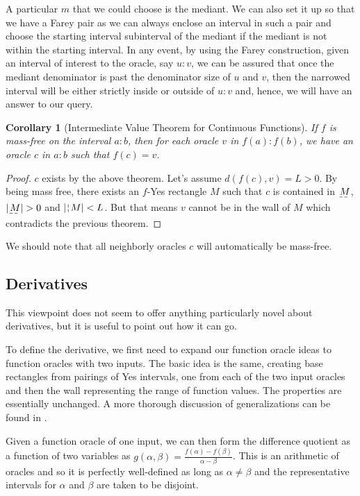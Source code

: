\documentclass[12pt]{article}
\newtheorem{corollary}{Corollary}[section]
\begin{document}
A particular $m$ that we could choose is the mediant. We can also set it up so that we have a Farey pair as we can always enclose an interval in such a pair and choose the starting interval subinterval of the mediant if the mediant is not within the starting interval. In any event, by using the Farey construction, given an interval of interest to the oracle, say $u:v$, we can be assured that once the mediant denominator is past the denominator size of $u$ and $v$, then the narrowed interval will be either strictly inside or outside of $u:v$ and, hence, we will have an answer to our query. 

\begin{corollary}[Intermediate Value Theorem for Continuous Functions]
If $f$ is mass-free on the interval $a:b$, then for each oracle $v$ in $f(a):f(b)$, we have an oracle $c$ in $a:b$ such that $f(c)=v$.
\end{corollary}

\begin{proof}
$c$ exists by the above theorem. Let's assume $d(f(c), v) = L > 0$. By being mass free, there exists an $f$-Yes rectangle $M$ such that $c$ is contained in $\base{M}$, $|\base{M}| > 0$ and $|\wall{M}| < L$. But that means $v$ cannot be in the wall of $M$ which contradicts the previous theorem. 
\end{proof}
    
We should note that all neighborly oracles $c$ will automatically be mass-free. 

\subsection{Derivatives}

This viewpoint does not seem to offer anything particularly novel about derivatives, but it is useful to point out how it can go. 

To define the derivative, we first need to expand our function oracle ideas to function oracles with two inputs. The basic idea is the same, creating base rectangles from pairings of Yes intervals, one from each of the two input oracles and then the wall representing the range of function values. The properties are essentially unchanged. A more thorough discussion of generalizations can be found in \cite{taylor23metric}.

Given a function oracle of one input, we can then form the difference quotient as a function of two variables as $g(\alpha, \beta) = \frac{ f(\alpha) - f(\beta) }{\alpha - \beta}$. This is an arithmetic of oracles and so it is perfectly well-defined as long as $\alpha \neq \beta$ and the representative intervals for $\alpha$ and $\beta$ are taken to be disjoint. 
\end{document}
